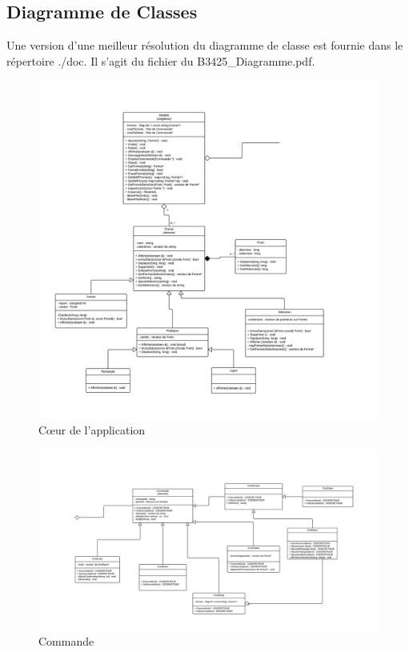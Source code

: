\documentclass[12pt]{article}
\begin{document}
\subsection{Diagramme de Classes}
Une version d'une meilleur résolution du diagramme de classe est fournie dans le répertoire ./doc. Il s'agit du fichier du B3425_Diagramme.pdf. 
\begin{figure}[!h]
\begin{center}
\includegraphics*[scale = 0.40]{Tp4Modele.png}
\caption{C\oe{}ur de l'application}
\label{fig:Modele}

\end{center}
\end{figure}

\begin{figure}
\begin{center}
\includegraphics[scale = 0.44]{Tp4Commande.png}
\caption{Commande}
\label{fig:Commande}
\end{center}
\end{figure}
\end{document}

